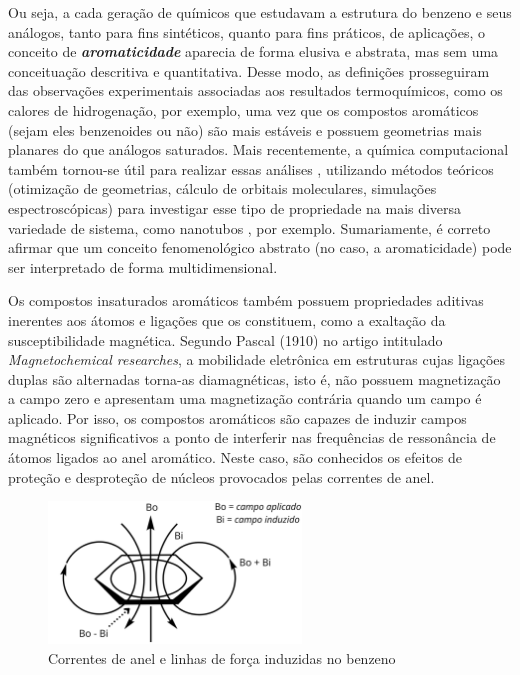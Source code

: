 Ou seja, a cada geração de químicos que estudavam a estrutura do benzeno e seus análogos, tanto para fins sintéticos, quanto para fins práticos, de aplicações, o conceito de \textbf{\textit{aromaticidade}} aparecia de forma elusiva e abstrata, mas sem uma conceituação descritiva e quantitativa. Desse modo, as definições prosseguiram das observações experimentais associadas aos resultados termoquímicos, como os calores de hidrogenação, por exemplo, uma vez que os compostos aromáticos (sejam eles benzenoides ou não) são mais estáveis e possuem geometrias mais planares do que análogos saturados. Mais recentemente, a química computacional também tornou-se útil para realizar essas análises \autocite{Jiao1997}, utilizando métodos teóricos (otimização de geometrias, cálculo de orbitais moleculares, simulações espectroscópicas) para investigar esse tipo de propriedade na mais diversa variedade de sistema, como nanotubos \autocite{Matsuo2003}, por exemplo. Sumariamente, é correto afirmar que um conceito fenomenológico abstrato (no caso, a aromaticidade) pode ser interpretado de forma multidimensional.

Os compostos insaturados aromáticos também possuem propriedades aditivas inerentes aos átomos e ligações que os constituem, como a exaltação da susceptibilidade magnética\autocite{Schleyer1996, Schleyer2001, Schleyer2014}. Segundo Pascal (1910) no artigo intitulado \textit{Magnetochemical researches}\autocite{pascal1910magnetochemical}, a mobilidade eletrônica em estruturas cujas ligações duplas são alternadas torna-as diamagnéticas, isto é, não possuem magnetização a campo zero e apresentam uma magnetização contrária quando um campo é aplicado. Por isso, os compostos aromáticos são capazes de induzir campos magnéticos significativos a ponto de interferir nas frequências de ressonância de átomos ligados ao anel aromático. Neste caso, são conhecidos os efeitos de proteção e desproteção de núcleos provocados pelas correntes de anel.

\begin{figure}[htb]
	\caption{\label{fig:2} Correntes de anel e linhas de força induzidas no benzeno}
	\begin{center}
		\includegraphics[width=0.60\textwidth]{images/magneticoPascal.png}
	\end{center}
\end{figure}


